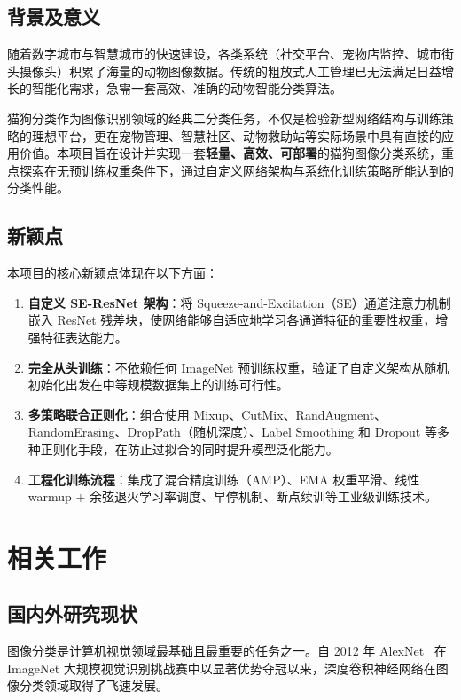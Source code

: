\documentclass[12pt,a4paper]{ctexart}
\begin{document}
\subsection{背景及意义}

随着数字城市与智慧城市的快速建设，各类系统（社交平台、宠物店监控、城市街头摄像头）积累了海量的动物图像数据。传统的粗放式人工管理已无法满足日益增长的智能化需求，急需一套高效、准确的动物智能分类算法。

猫狗分类作为图像识别领域的经典二分类任务，不仅是检验新型网络结构与训练策略的理想平台，更在宠物管理、智慧社区、动物救助站等实际场景中具有直接的应用价值。本项目旨在设计并实现一套\textbf{轻量、高效、可部署}的猫狗图像分类系统，重点探索在无预训练权重条件下，通过自定义网络架构与系统化训练策略所能达到的分类性能。

\subsection{新颖点}

本项目的核心新颖点体现在以下方面：

\begin{enumerate}
    \item \textbf{自定义 SE-ResNet 架构}：将 Squeeze-and-Excitation（SE）通道注意力机制嵌入 ResNet 残差块，使网络能够自适应地学习各通道特征的重要性权重，增强特征表达能力。
    \item \textbf{完全从头训练}：不依赖任何 ImageNet 预训练权重，验证了自定义架构从随机初始化出发在中等规模数据集上的训练可行性。
    \item \textbf{多策略联合正则化}：组合使用 Mixup、CutMix、RandAugment、RandomErasing、DropPath（随机深度）、Label Smoothing 和 Dropout 等多种正则化手段，在防止过拟合的同时提升模型泛化能力。
    \item \textbf{工程化训练流程}：集成了混合精度训练（AMP）、EMA 权重平滑、线性 warmup + 余弦退火学习率调度、早停机制、断点续训等工业级训练技术。
\end{enumerate}


\section{相关工作}

\subsection{国内外研究现状}

图像分类是计算机视觉领域最基础且最重要的任务之一。自 2012 年 AlexNet~\cite{krizhevsky2012imagenet} 在 ImageNet 大规模视觉识别挑战赛中以显著优势夺冠以来，深度卷积神经网络在图像分类领域取得了飞速发展。
\end{document}
